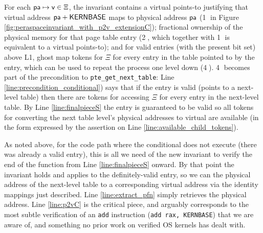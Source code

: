 For each $\textsf{pa}\mapsto \textsf{v} \in\Xi$, the invariant contains a virtual points-to justifying that virtual address
$\textsf{pa}+\textsf{KERNBASE}$ maps to physical address $\textsf{pa}$
(\textcircled{1} in Figure \ref{fig:peraspaceinvariant_with_p2v_extensionC});
fractional ownership of the physical memory for that page table entry (\textcircled{2}, which together with \textcircled{1} is equivalent
to a virtual points-to);
and for valid entries (with the present bit set) above L1, ghost map tokens for $\Xi$ for every entry in the table pointed to by the entry, which can be used
to repeat the process one level down (\textcircled{4}). 
\textcircled{4} becomes part of the precondition to \lstinline|pte_get_next_table|:
Line \ref{line:precondition_conditional}) says that if the entry is valid (points to a next-level table)
then there are tokens for accessing $\Xi$ for every entry in the next-level table.
By Line \ref{line:finalpieceS} the entry is guaranteed to be valid so all tokens for converting the next table level's physical addresses to virtual
are available (in the form expressed by the assertion on Line \ref{line:available_child_tokens}).

As noted above, for the code path where the conditional does not execute (there was already a valid entry), this is all we need of the new
invariant to verify the end of the function from Line \ref{line:finalpieceS} onward.
By that point the invariant holds and applies to the definitely-valid entry,
so we can the physical address of the next-level table to a corresponding virtual address via the identity mappings just described.
Line \ref{line:extract_pfn} simply retrieves the physical address.
Line \ref{line:p2vC} is the critical piece, and arguably corresponds to the most subtle verification of an \lstinline|add| instruction
(\lstinline|add rax, KERNBASE|)
that we are aware of, and something no prior work on verified OS kernels has dealt with.

